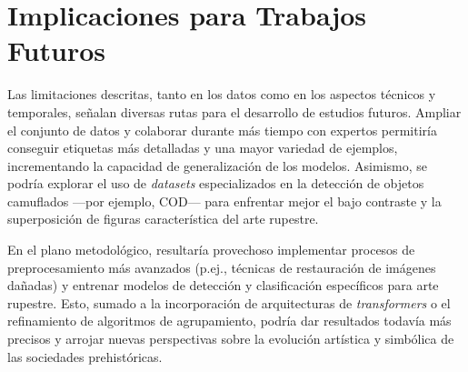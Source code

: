 \section{Implicaciones para Trabajos Futuros}

Las limitaciones descritas, tanto en los datos como en los aspectos técnicos y temporales, señalan diversas rutas para el desarrollo de estudios futuros. Ampliar el conjunto de datos y colaborar durante más tiempo con expertos permitiría conseguir etiquetas más detalladas y una mayor variedad de ejemplos, incrementando la capacidad de generalización de los modelos. Asimismo, se podría explorar el uso de \emph{datasets} especializados en la detección de objetos camuflados —por ejemplo, COD— para enfrentar mejor el bajo contraste y la superposición de figuras característica del arte rupestre.

En el plano metodológico, resultaría provechoso implementar procesos de preprocesamiento más avanzados (p.ej., técnicas de restauración de imágenes dañadas) y entrenar modelos de detección y clasificación específicos para arte rupestre. Esto, sumado a la incorporación de arquitecturas de \textit{transformers} o el refinamiento de algoritmos de agrupamiento, podría dar resultados todavía más precisos y arrojar nuevas perspectivas sobre la evolución artística y simbólica de las sociedades prehistóricas.

